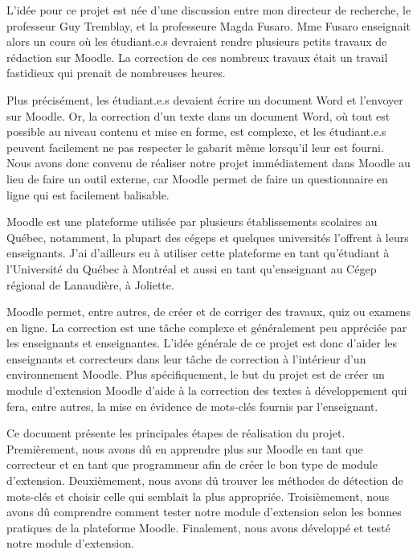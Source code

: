 \begin{introduction}

L'id\'ee pour ce projet est n\'ee d'une discussion entre mon directeur de recherche, le professeur Guy Tremblay, et la professeure Magda Fusaro.
Mme Fusaro enseignait alors un cours o\`u les \'etudiant.e.s devraient rendre plusieurs petits travaux de r\'edaction sur Moodle.
La correction de ces nombreux travaux \'etait un travail fastidieux qui prenait de nombreuses heures.

Plus pr\'ecis\'ement, les \'etudiant.e.s devaient \'ecrire un document Word et l'envoyer sur Moodle.
Or, la correction d'un texte dans un document Word, o\`u tout est possible au niveau contenu et mise en forme, est complexe,  et les \'etudiant.e.s peuvent facilement ne pas respecter le gabarit m\^eme lorsqu'il leur est fourni.
Nous avons donc convenu de r\'ealiser notre projet imm\'ediatement dans Moodle au lieu de faire un outil externe, car Moodle permet de faire un questionnaire en ligne qui est facilement balisable.

Moodle est une plateforme utilisée par plusieurs établissements scolaires au Québec, notamment, la plupart des cégeps et quelques universités l'offrent à leurs enseignants.
J'ai d'ailleurs eu à utiliser cette plateforme en tant qu'étudiant à l'Université du Québec à Montréal et aussi en tant qu'enseignant au Cégep régional de Lanaudière, à Joliette.

Moodle permet, entre autres, de créer et de corriger des travaux, quiz ou examens en ligne.
La correction est une tâche complexe et g\'en\'eralement peu appréciée par les enseignants et enseignantes.
L'idée générale de ce projet est donc d'aider les enseignants et correcteurs dans leur tâche de correction à l'intérieur d'un environnement Moodle.
Plus sp\'ecifiquement, le but du projet est de créer un module d'extension Moodle d'aide à la correction des textes à développement qui fera, entre autres, la mise en évidence de mots-clés fournis par l'enseignant.

Ce document pr\'esente les principales étapes de réalisation du projet.
Premièrement, nous avons d\^u en apprendre plus sur Moodle en tant que correcteur et en tant que programmeur afin de créer le bon type de module d'extension.
Deuxièmement, nous avons d\^u trouver les méthodes de détection de mots-clés et choisir celle qui semblait la plus appropri\'ee.
Troisièmement, nous avons d\^u comprendre comment tester notre module d'extension selon les bonnes pratiques de la plateforme Moodle.
Finalement, nous avons développ\'e et test\'e notre module d'extension.

\end{introduction}
